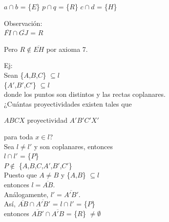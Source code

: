 \documentclass[12pt]{book}
\theoremstyle{definition}
\begin{document}
    $a \cap b$ = \{$E$\}
    $p \cap q$ = \{$R$\}
    $c \cap d$ = \{$H$\}

      Observación:\\
        $\overline{FI} \cap \overline{GJ}$ = $R$

    Pero $R \notin \overline{EH}$ por axioma 7.

  Ej:\\
  Sean
    \{$A$,$B$,$C$\} $\subseteq l$\\
    \{$A'$,$B'$,$C'$\} $\subseteq l$\\

      donde los puntos son distintos y las rectas coplanares.\\

      ¿Cuántas proyectividades existen tales que

    \begin{center}
      $ABCX$ proyectividad $A'B'C'X'$
    \end{center}
        
      para toda $x \in l$?\\

      Sea $l \neq l'$ y son coplanares, entonces\\

    $l \cap l'$ = \{$P$\}\\
    $P \notin$ \{$A$,$B$,$C$,$A'$,$B'$,$C'$\}\\
    Puesto que $A \neq B$ y \{$A$,$B$\} $\subseteq l$\\
    entonces $l = \overline{AB}$.\\
    Análogamente, $l' = \overline{A'B'}$.\\

    Así,
    $\overline{AB} \cap \overline{A'B'}$ = $l \cap l'$ = \{$P$\}\\
    entonces $\overline{AB'} \cap \overline{A'B}$ = \{$R$\} $\neq \emptyset$
\end{document}
